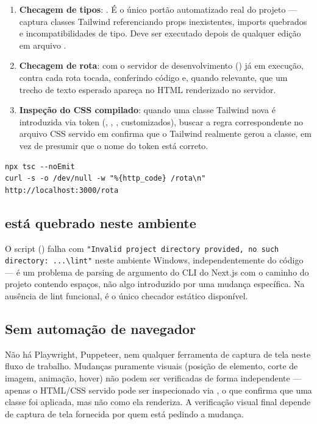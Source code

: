 \begin{enumerate}
  \item \textbf{Checagem de tipos}: . É o único portão
        automatizado real do projeto --- captura classes Tailwind referenciando
        props inexistentes, imports quebrados e incompatibilidades de tipo.
        Deve ser executado depois de qualquer edição em arquivo .
  \item \textbf{Checagem de rota}: com o servidor de desenvolvimento
        () já em execução,  contra cada rota tocada,
        conferindo código  e, quando relevante, que um trecho de texto
        esperado apareça no HTML renderizado no servidor.
  \item \textbf{Inspeção do CSS compilado}: quando uma classe Tailwind nova é
        introduzida via token (, , ,
         customizados), buscar a regra correspondente no arquivo
        CSS servido em  confirma que o
        Tailwind realmente gerou a classe, em vez de presumir que o nome do
        token está correto.
\end{enumerate}

\begin{lstlisting}[style=shell]
npx tsc --noEmit
curl -s -o /dev/null -w "%{http_code} /rota\n" http://localhost:3000/rota
\end{lstlisting}

\subsection{ está quebrado neste ambiente}

O script  () falha com
\texttt{"Invalid project directory provided, no such directory: ...\textbackslash lint"}
neste ambiente Windows, independentemente do código --- é um problema de
parsing de argumento do CLI do Next.js com o caminho do projeto contendo
espaços, não algo introduzido por uma mudança específica. Na ausência de lint
funcional,  é o único checador estático disponível.

\subsection{Sem automação de navegador}

Não há Playwright, Puppeteer, nem qualquer ferramenta de captura de tela neste
fluxo de trabalho. Mudanças puramente visuais (posição de elemento, corte de
imagem, animação, hover) não podem ser verificadas de forma independente ---
apenas o HTML/CSS servido pode ser inspecionado via , o que confirma
que uma classe foi aplicada, mas não como ela renderiza. A verificação visual
final depende de captura de tela fornecida por quem está pedindo a mudança.

